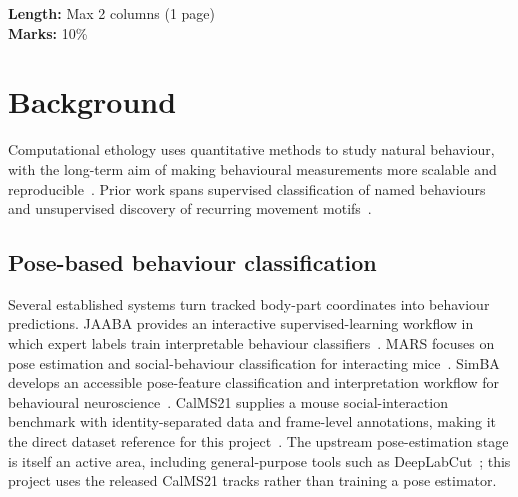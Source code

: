 \documentclass[conference]{IEEEtran}
\begin{document}
\noindent \textbf{Length:} Max 2 columns (1 page)\\
\noindent \textbf{Marks:} 10\%

\section{Background}\label{sec:background}
Computational ethology uses quantitative methods to study natural behaviour, with the long-term aim of making behavioural measurements more scalable and reproducible~\cite{anderson2014computational}. Prior work spans supervised classification of named behaviours and unsupervised discovery of recurring movement motifs~\cite{berman2014mapping,mathis2020deepbehavior}.

\subsection{Pose-based behaviour classification}
Several established systems turn tracked body-part coordinates into behaviour predictions. JAABA provides an interactive supervised-learning workflow in which expert labels train interpretable behaviour classifiers~\cite{kabra2013jaaba}. MARS focuses on pose estimation and social-behaviour classification for interacting mice~\cite{segalin2021mars}. SimBA develops an accessible pose-feature classification and interpretation workflow for behavioural neuroscience~\cite{goodwin2024simba}. CalMS21 supplies a mouse social-interaction benchmark with identity-separated data and frame-level annotations, making it the direct dataset reference for this project~\cite{sun2021calms21}. The upstream pose-estimation stage is itself an active area, including general-purpose tools such as DeepLabCut~\cite{mathis2018deeplabcut}; this project uses the released CalMS21 tracks rather than training a pose estimator.
\end{document}
